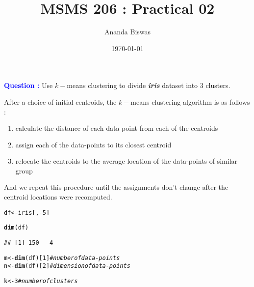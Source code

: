 \documentclass[11pt, a4paper]{article}\usepackage[]{graphicx}\usepackage[]{xcolor}
\title{MSMS 206 : Practical 02}
\author{Ananda Biswas}
\date{\today}
\makeatletter
\newcommand{\hlnum}[1]{\textcolor[rgb]{0.686,0.059,0.569}{#1}}%
\newcommand{\hlcom}[1]{\textcolor[rgb]{0.678,0.584,0.686}{\textit{#1}}}%
\newcommand{\hlopt}[1]{\textcolor[rgb]{0,0,0}{#1}}%
\newcommand{\hldef}[1]{\textcolor[rgb]{0.345,0.345,0.345}{#1}}%
\newcommand{\hlkwb}[1]{\textcolor[rgb]{0.69,0.353,0.396}{#1}}%
\newcommand{\hlkwd}[1]{\textcolor[rgb]{0.737,0.353,0.396}{\textbf{#1}}}%
\newenvironment{kframe}{%
 \def\at@end@of@kframe{}%
 \ifinner\ifhmode%
  \def\at@end@of@kframe{\end{minipage}}%
  \begin{minipage}{\columnwidth}%
 \fi\fi%
 \def\FrameCommand##1{\hskip\@totalleftmargin \hskip-\fboxsep
 \colorbox{shadecolor}{##1}\hskip-\fboxsep
     \hskip-\linewidth \hskip-\@totalleftmargin \hskip\columnwidth}%
 \MakeFramed {\advance\hsize-\width
   \@totalleftmargin\z@ \linewidth\hsize
   \@setminipage}}%
 {\par\unskip\endMakeFramed%
 \at@end@of@kframe}
\newenvironment{knitrout}{}{} %
\makeatother
\begin{document}
\maketitle


 \hspace{0.2cm} \textcolor{blue}{\textbf{Question :}} Use $k-$means clustering to divide \textbf{\textit{iris}} dataset into 3 clusters.

\vspace{1cm}

\faArrowAltCircleRight[regular] \hspace{0.2cm} After a choice of initial centroids, the $k-$means clustering algorithm is as follows :

\begin{enumerate}[(1)]
\item calculate the distance of each data-point from each of the centroids
\item assign each of the data-points to its closest centroid
\item relocate the centroids to the average location of the data-points of similar group
\end{enumerate}

And we repeat this procedure until the assignments don't change after the centroid locations were recomputed.

\begin{knitrout}
\color{fgcolor}\begin{kframe}
\begin{alltt}
\hldef{df} \hlkwb{<-} \hldef{iris[,} \hlopt{-}\hlnum{5}\hldef{]}
\end{alltt}
\end{kframe}
\end{knitrout}

\begin{knitrout}
\color{fgcolor}\begin{kframe}
\begin{alltt}
\hlkwd{dim}\hldef{(df)}
\end{alltt}
\begin{verbatim}
## [1] 150   4
\end{verbatim}
\end{kframe}
\end{knitrout}

\begin{knitrout}
\color{fgcolor}\begin{kframe}
\begin{alltt}
\hldef{m} \hlkwb{<-} \hlkwd{dim}\hldef{(df)[}\hlnum{1}\hldef{]} \hlcom{# number of data-points}
\hldef{n} \hlkwb{<-} \hlkwd{dim}\hldef{(df)[}\hlnum{2}\hldef{]} \hlcom{# dimension of data-points}

\hldef{k} \hlkwb{<-} \hlnum{3} \hlcom{# number of clusters}
\end{alltt}
\end{kframe}
\end{knitrout}
\end{document}
